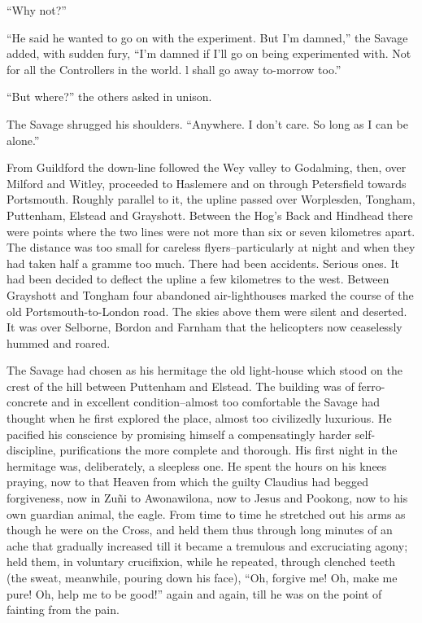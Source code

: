 \documentclass[12pt]{report}
\begin{document}
``Why not?''

``He said he wanted to go on with the experiment. But I'm damned,'' the
Savage added, with sudden fury, ``I'm damned if I'll go on being
experimented with. Not for all the Controllers in the world. l shall go
away to-morrow too.''

``But where?'' the others asked in unison.

The Savage shrugged his shoulders. ``Anywhere. I don't care. So long as
I can be alone.''

From Guildford the down-line followed the Wey valley to Godalming, then,
over Milford and Witley, proceeded to Haslemere and on through
Petersfield towards Portsmouth. Roughly parallel to it, the upline
passed over Worplesden, Tongham, Puttenham, Elstead and Grayshott.
Between the Hog's Back and Hindhead there were points where the two
lines were not more than six or seven kilometres apart. The distance was
too small for careless flyers--particularly at night and when they had
taken half a gramme too much. There had been accidents. Serious ones. It
had been decided to deflect the upline a few kilometres to the west.
Between Grayshott and Tongham four abandoned air-lighthouses marked the
course of the old Portsmouth-to-London road. The skies above them were
silent and deserted. It was over Selborne, Bordon and Farnham that the
helicopters now ceaselessly hummed and roared.

The Savage had chosen as his hermitage the old light-house which stood
on the crest of the hill between Puttenham and Elstead. The building was
of ferro-concrete and in excellent condition--almost too comfortable the
Savage had thought when he first explored the place, almost too
civilizedly luxurious. He pacified his conscience by promising himself a
compensatingly harder self-discipline, purifications the more complete
and thorough. His first night in the hermitage was, deliberately, a
sleepless one. He spent the hours on his knees praying, now to that
Heaven from which the guilty Claudius had begged forgiveness, now in
Zuñi to Awonawilona, now to Jesus and Pookong, now to his own guardian
animal, the eagle. From time to time he stretched out his arms as though
he were on the Cross, and held them thus through long minutes of an ache
that gradually increased till it became a tremulous and excruciating
agony; held them, in voluntary crucifixion, while he repeated, through
clenched teeth (the sweat, meanwhile, pouring down his face), ``Oh,
forgive me! Oh, make me pure! Oh, help me to be good!'' again and again,
till he was on the point of fainting from the pain.
\end{document}
